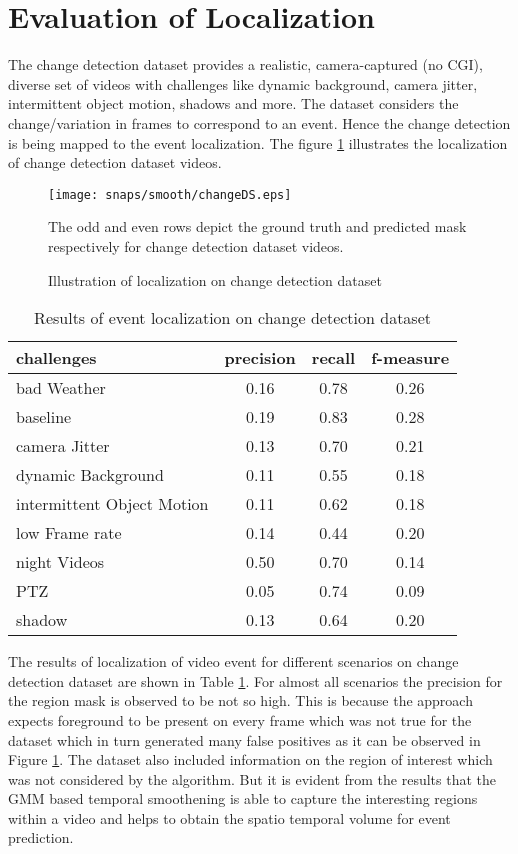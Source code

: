 \section{Evaluation of Localization}
\label{sec:EvLoc}
The change detection dataset \citep{cdnet} provides  a realistic, camera-captured (no CGI), diverse set of videos with challenges like dynamic background, camera jitter, intermittent object motion, shadows and more.  The dataset considers the change/variation in frames to correspond to an event. Hence the change detection is being mapped to the event localization.  The figure \ref{fig:changeDb} illustrates the localization of change detection dataset videos.
\begin{figure}[htpb]
   \begin{center}
	    \texttt{[image: snaps/smooth/changeDS.eps]}     
     \caption {Illustration of localization on change detection dataset}
   \label{fig:changeDb}
    \medskip \small The odd and even rows depict the ground truth and predicted mask respectively for change detection dataset videos. 
   \end{center}
 \end{figure}
\begin{table}[htbp]
   \caption{Results of event localization on change detection dataset}
   \begin{center}
   \begin{tabular}{|l|c|c|c|} \hline
        \textbf{challenges} & \textbf{precision} & \textbf{recall} & \textbf{f-measure} \\ \hline
		bad Weather & 0.16 & 0.78 & 0.26\\
		baseline & 0.19 & 0.83 & 0.28\\
		camera Jitter & 0.13 & 0.70 & 0.21 \\
		dynamic Background & 0.11 & 0.55 &  0.18\\
		intermittent Object Motion & 0.11 & 0.62 & 0.18 \\
		low Frame rate & 0.14 & 0.44 & 0.20 \\
		night Videos & 0.50 & 0.70 & 0.14 \\
		PTZ & 0.05 & 0.74 & 0.09\\
		shadow & 0.13 & 0.64 & 0.20\\ \hline
   \end{tabular}
   \label{tab:evalLoc}
   \end{center}
 \end{table} 
\par The results of localization of video event for different scenarios on change detection dataset are shown in Table \ref{tab:evalLoc}. For almost all scenarios the precision for the region mask is observed to be not so high. This is because the approach expects foreground to be present on every frame which was not true for the dataset which in turn generated many false positives as it can be observed in Figure \ref{fig:changeDb}.  The dataset also included information on the region of interest which was not considered by the algorithm.  But it is evident from the results that the GMM based temporal smoothening is able to capture the interesting regions within a video and helps to obtain the spatio temporal volume for event prediction.

